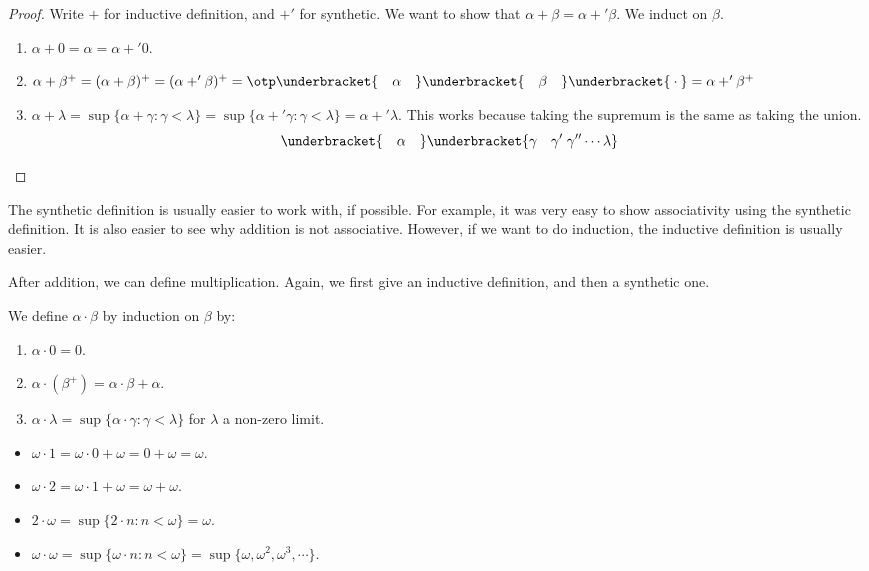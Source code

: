 \documentclass[a4paper]{article}
\begin{document}
\begin{proof}
  Write $+$ for inductive definition, and $+'$ for synthetic. We want to show that $\alpha + \beta = \alpha +' \beta$. We induct on $\beta$.

  \begin{enumerate}
    \item $\alpha + 0 = \alpha = \alpha +' 0$.
    \item $\alpha + \beta^+ = (\alpha + \beta)^+ = (\alpha +' \beta)^+ = \otp\underbracket{\quad\vphantom\beta\alpha\vphantom\beta\quad}\underbracket{\quad\beta\quad}\underbracket{\vphantom\beta\cdot\vphantom\beta} = \alpha +' \beta^+$
    \item $\alpha + \lambda = \sup\{\alpha + \gamma: \gamma < \lambda\} = \sup \{\alpha +' \gamma: \gamma < \lambda\} = \alpha +' \lambda$. This works because taking the supremum is the same as taking the union.
      \[
        \underbracket{\quad\vphantom\gamma\alpha\vphantom\gamma\quad}\underbracket{\gamma\quad\gamma'\;\gamma''\cdots \lambda}
      \]
  \end{enumerate}
\end{proof}
The synthetic definition is usually easier to work with, if possible. For example, it was very easy to show associativity using the synthetic definition. It is also easier to see why addition is not associative. However, if we want to do induction, the inductive definition is usually easier.

After addition, we can define multiplication. Again, we first give an inductive definition, and then a synthetic one.
\begin{defi}
  We define $\alpha\cdot \beta$ by induction on $\beta$ by:
  \begin{enumerate}
    \item $\alpha\cdot 0 = 0$.
    \item $\alpha\cdot (\beta^+) = \alpha\cdot \beta + \alpha$.
    \item $\alpha\cdot \lambda = \sup\{\alpha\cdot \gamma: \gamma < \lambda\}$ for $\lambda$ a non-zero limit.
  \end{enumerate}
\end{defi}

\begin{eg}\leavevmode
  \begin{itemize}
    \item $\omega \cdot 1 = \omega\cdot 0 + \omega = 0 + \omega = \omega$.
    \item $\omega \cdot 2 = \omega \cdot 1 + \omega = \omega + \omega$.
    \item $2\cdot \omega = \sup\{2\cdot n: n < \omega\} = \omega$.
    \item $\omega\cdot \omega = \sup \{\omega\cdot n: n < \omega\} = \sup\{\omega, \omega^2, \omega^3, \cdots\}$.
  \end{itemize}
\end{eg}
\end{document}
